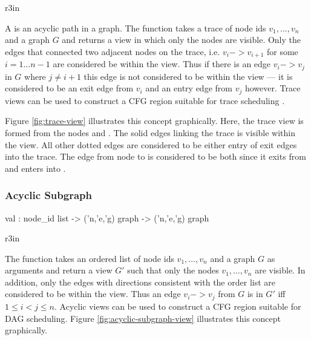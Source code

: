 \begin{wrapfigure}{r}{3in}
  \begin{Boxit}
  \end{Boxit}
  \label{fig:trace-view}
  \caption{A trace view}
\end{wrapfigure}
A  is an acyclic path in a graph.
The function  takes a trace of node ids
$v_1,\ldots,v_n$ and a graph $G$ and 
returns a view in which only the nodes are visible.
Only the edges that connected two adjacent nodes on the trace, i.e. 
$v_i -> v_{i+1}$ for some $i = 1 \ldots n-1$ are considered be within
the view.  Thus if there is an edge $v_i -> v_j$ in $G$ where
$j \ne i+1$ this edge is not considered to be within the view --- it
is considered to be an exit edge from $v_i$ and an entry edge
from $v_j$ however.  Trace views can be used to construct a CFG region
suitable for trace scheduling \cite{trace-scheduling,bulldog}.   

Figure \ref{fig:trace-view} illustrates this concept graphically.
Here, the trace view is formed from the
nodes  and .  The
solid edges linking the trace is visible within the view.  All other
dotted edges are considered to be either entry of exit edges into
the trace.  The edge from node  to  is considered to
be both since it exits from  and enters into .

\subsubsection{Acyclic Subgraph}
\begin{SML}
   val  : 
     node_id list -> 
     ('n,'e,'g) graph -> ('n,'e,'g) graph
\end{SML}
\begin{wrapfigure}{r}{3in}
  \begin{Boxit}
  \end{Boxit}
  \label{fig:acyclic-subgraph-view}
  \caption{An acyclic subgraph}
\end{wrapfigure}
The function  takes an ordered
list of node ids $v_1,\ldots,v_n$ and a graph $G$ as arguments
and return a view $G'$ such that only the nodes $v_1,\ldots,v_n$
are visible.  In addition, only the edges with directions consistent
with the order list are considered to be within the view.
Thus an edge $v_i -> v_j$ from $G$ is in $G'$ iff $1 \le i < j \le n$.
Acyclic views can be used to construct a CFG region suitable
for DAG scheduling.
Figure \ref{fig:acyclic-subgraph-view} illustrates this concept graphically.

